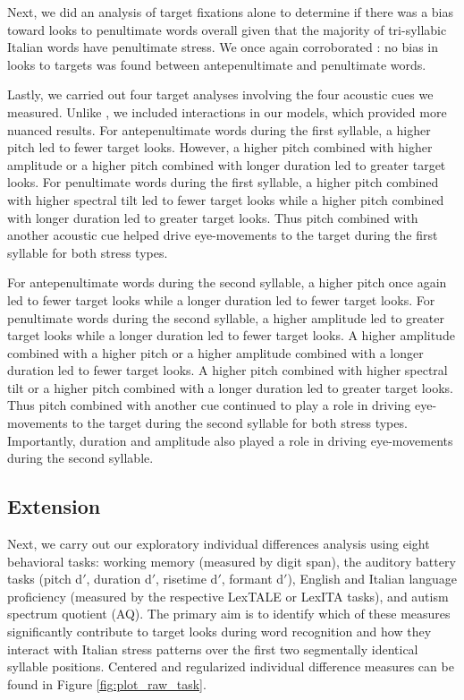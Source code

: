 Next, we did an analysis of target fixations alone to determine if there was a bias toward looks to penultimate words overall given that the majority of tri-syllabic Italian words have penultimate stress. We once again corroborated \cite{Sulpizio_McQueen_2012}: no bias in looks to targets was found between antepenultimate and penultimate words.

Lastly, we carried out four target analyses involving the four acoustic cues we measured. Unlike \cite{Sulpizio_McQueen_2012}, we included interactions in our models, which provided more nuanced results. For antepenultimate words during the first syllable, a higher pitch led to fewer target looks. However, a higher pitch combined with higher amplitude or a higher pitch combined with longer duration led to greater target looks. For penultimate words during the first syllable, a higher pitch combined with higher spectral tilt led to fewer target looks while a higher pitch combined with longer duration led to greater target looks. Thus pitch combined with another acoustic cue helped drive eye-movements to the target during the first syllable for both stress types.

For antepenultimate words during the second syllable, a higher pitch once again led to fewer target looks while a longer duration led to fewer target looks. For penultimate words during the second syllable, a higher amplitude led to greater target looks while a longer duration led to fewer target looks. A higher amplitude combined with a higher pitch or a higher amplitude combined with a longer duration led to fewer target looks. A higher pitch combined with higher spectral tilt or a higher pitch combined with a longer duration led to greater target looks. Thus pitch combined with another cue continued to play a role in driving eye-movements to the target during the second syllable for both stress types. Importantly, duration and amplitude also played a role in driving eye-movements during the second syllable. 

\subsection{Extension}

Next, we carry out our exploratory individual differences analysis using eight behavioral tasks: working memory (measured by digit span), the auditory battery tasks (pitch d$'$, duration d$'$, risetime d$'$, formant d$'$), English and Italian language proficiency (measured by the respective LexTALE or LexITA tasks), and autism spectrum quotient (AQ). The primary aim is to identify which of these measures significantly contribute to target looks during word recognition and how they interact with Italian stress patterns over the first two segmentally identical syllable positions. Centered and regularized individual difference measures can be found in Figure \ref{fig:plot_raw_task}.

